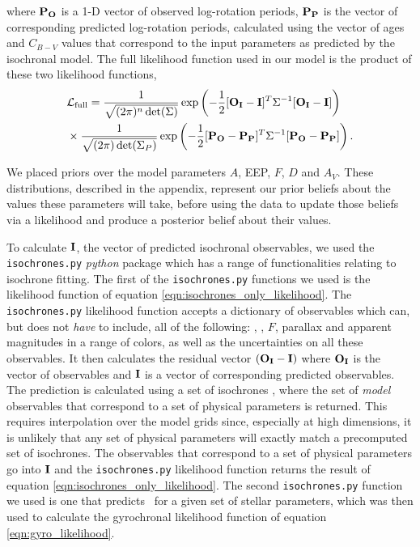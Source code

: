 where ${\bf P_O}$ is a 1-D vector of observed log-rotation periods, ${\bf
P_P}$ is the vector of corresponding predicted log-rotation periods,
calculated using the vector of ages and $C_{B-V}$ values that correspond to
the input parameters as predicted by the isochronal model.
The full likelihood function used in our model is the product of these two
likelihood functions,
\begin{eqnarray} \label{eqn:full_likelihood}
    & \mathcal{L_{\mathrm{full}}} = \frac{1}{\sqrt{(2\pi)^n \det(\Sigma)}}
    \exp\left( -\frac{1}{2} [{\bf O_I} - {\bf I}]^T \Sigma ^{-1}
    [{\bf O_I} - {\bf I}]\right) \\ \nonumber
    & \times
    \frac{1}{\sqrt{(2\pi) \det(\Sigma_P)}}
    \exp\left( -\frac{1}{2} [{\bf P_O} - {\bf P_P}]^T \Sigma ^{-1}
    [{\bf P_O} - {\bf P_P}]\right).
\end{eqnarray}

We placed priors over the model parameters $A$, EEP, $F$, $D$ and $A_V$.
These distributions, described in the appendix, represent our prior beliefs
about the values these parameters will take, before using the data to update
those beliefs via a likelihood and produce a posterior belief about their
values.

To calculate ${\bf I}$, the vector of predicted isochronal observables, we
used the {\tt isochrones.py} {\it python} package which has a range of
functionalities relating to isochrone fitting.
The first of the {\tt isochrones.py} functions we used is the likelihood
function of equation \ref{eqn:isochrones_only_likelihood}.
The {\tt isochrones.py} likelihood function accepts a dictionary of
observables which can, but does not {\it have} to include, all of the
following: \teff, \logg, $F$, parallax and apparent magnitudes in a range of
colors, as well as the uncertainties on all these observables.
It then calculates the residual vector $({\bf O_I} - {\bf I})$ where ${\bf
O_I}$ is the vector of observables and ${\bf I}$ is a vector of corresponding
predicted observables.
The prediction is calculated using a set of isochrones \citep[we used the MIST
models,][]{paxton2011, paxton2013, paxton2015, dotter2016, choi2016,
paxton2018}, where the set of {\it model} observables that correspond to a set
of physical parameters is returned.
This requires interpolation over the model grids since, especially at high
dimensions, it is unlikely that any set of physical parameters will exactly
match a precomputed set of isochrones.
The observables that correspond to a set of physical parameters go into ${\bf
I}$ and the {\tt isochrones.py} likelihood function returns the result of
equation \ref{eqn:isochrones_only_likelihood}.
The second {\tt isochrones.py} function we used is one that predicts \cbv\ for
a given set of stellar parameters, which was then used to calculate the
gyrochronal likelihood function of equation \ref{eqn:gyro_likelihood}.


